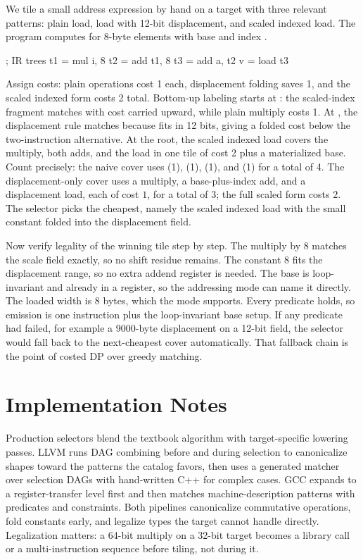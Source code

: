 We tile a small address expression by hand on a target with three relevant patterns: plain load, load with 12-bit displacement, and scaled indexed load.
The program computes  for 8-byte elements with base  and index .
\begin{irlisting}
; IR trees
t1 = mul i, 8
t2 = add t1, 8
t3 = add a, t2
v = load t3
\end{irlisting}
Assign costs: plain operations cost 1 each, displacement folding saves 1, and the scaled indexed form costs 2 total.
Bottom-up labeling starts at : the scaled-index fragment matches with cost carried upward, while plain multiply costs 1.
At , the displacement rule matches because  fits in 12 bits, giving a folded cost below the two-instruction alternative.
At the root, the scaled indexed load covers the multiply, both adds, and the load in one tile of cost 2 plus a materialized base.
Count precisely: the naive cover uses  (1),  (1),  (1), and  (1) for a total of 4.
The displacement-only cover uses a multiply, a base-plus-index add, and a displacement load, each of cost $1$, for a total of $3$; the full scaled form costs $2$.
The selector picks the cheapest, namely the scaled indexed load with the small constant folded into the displacement field.

Now verify legality of the winning tile step by step.
The multiply by 8 matches the scale field exactly, so no shift residue remains.
The constant 8 fits the displacement range, so no extra addend register is needed.
The base  is loop-invariant and already in a register, so the addressing mode can name it directly.
The loaded width is 8 bytes, which the mode supports.
Every predicate holds, so emission is one instruction plus the loop-invariant base setup.
If any predicate had failed, for example a 9000-byte displacement on a 12-bit field, the selector would fall back to the next-cheapest cover automatically.
That fallback chain is the point of costed DP over greedy matching.

\section{Implementation Notes}\label{sec:ch25-implementation}

Production selectors blend the textbook algorithm with target-specific lowering passes.
LLVM runs DAG combining before and during selection to canonicalize shapes toward the patterns the catalog favors, then uses a generated matcher over selection DAGs with hand-written C++ for complex cases.
GCC expands to a register-transfer level first and then matches machine-description patterns with predicates and constraints.
Both pipelines canonicalize commutative operations, fold constants early, and legalize types the target cannot handle directly.
Legalization matters: a 64-bit multiply on a 32-bit target becomes a library call or a multi-instruction sequence before tiling, not during it.

